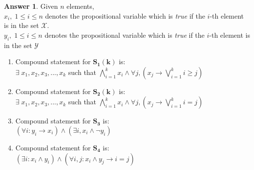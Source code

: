 \documentclass[a4paper]{article}
\theoremstyle{definition}
\newtheorem{answer}{Answer}
\begin{document}
\vspace*{2em}
\begin{answer}
    Given $n$ elements,\\
    $x_i, \; 1 \le i \le n$ denotes the propositional variable which is \textit{true} if the $i$-th element is in the set $\mathcal{X}$.\\
    $y_i, \; 1 \le i \le n$ denotes the propositional variable which is \textit{true} if the $i$-th element is in the set $\mathcal{Y}$
    \begin{enumerate}
        \item Compound statement for $\boldsymbol{S_1(k)}$ is:\\
        $\exists \; x_1, x_2, x_3, ..., x_k$ such that $\bigwedge\limits_{i = 1}^k x_i \land \forall j, \left(x_j \rightarrow \bigvee\limits_{i = 1}^k i \ge j\right)$
        \item Compound statement for $\boldsymbol{S_2(k)}$ is:\\
        $\exists \; x_1, x_2, x_3, ..., x_k$ such that $\bigwedge\limits_{i = 1}^k x_i \land \forall j, \left(x_j \rightarrow \bigvee\limits_{i = 1}^k i = j\right)$
        \item Compound statement for $\boldsymbol{S_3}$ is:\\
        $\left(\forall i : y_i \rightarrow x_i\right) \land \left(\exists i, x_i \land \lnot y_i\right)$
        \item Compound statement for $\boldsymbol{S_4}$ is:\\ 
        $\left(\exists i : x_i \land y_i\right) \land \left(\forall i, j : x_i \land y_j \rightarrow i = j\right)$
    \end{enumerate}
    
\end{answer}
\vspace*{2em}
\end{document}
